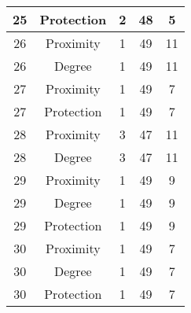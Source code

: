 \documentclass[results.tex]{subfiles}
\begin{document}
\begin{center}
\begin{tabular}{| c || c | c | c | c |}
            \hline
            25                      & Protection                   & 2                      & 48                      & 5                    \\
            \hline
            26                      & Proximity                    & 1                      & 49                      & 11                   \\
            \hline
            26                      & Degree                       & 1                      & 49                      & 11                   \\
            \hline
            27                      & Proximity                    & 1                      & 49                      & 7                    \\
            \hline
            27                      & Protection                   & 1                      & 49                      & 7                    \\
            \hline
            28                      & Proximity                    & 3                      & 47                      & 11                   \\
            \hline
            28                      & Degree                       & 3                      & 47                      & 11                   \\
            \hline
            29                      & Proximity                    & 1                      & 49                      & 9                    \\
            \hline
            29                      & Degree                       & 1                      & 49                      & 9                    \\
            \hline
            29                      & Protection                   & 1                      & 49                      & 9                    \\
            \hline
            30                      & Proximity                    & 1                      & 49                      & 7                    \\
            \hline
            30                      & Degree                       & 1                      & 49                      & 7                    \\
            \hline
            30                      & Protection                   & 1                      & 49                      & 7                    \\

\end{tabular}
\end{center}
\end{document}
